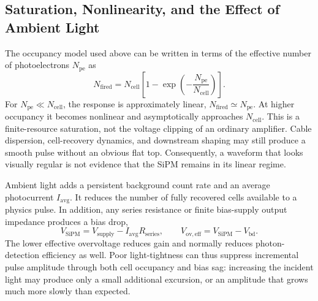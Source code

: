 \documentclass[10pt,letterpaper]{article}
\begin{document}
\subsection{Saturation, Nonlinearity, and the Effect of Ambient Light}

The occupancy model used above can be written in terms of the effective number of
photoelectrons $N_{\mathrm{pe}}$ as
\begin{equation}
  N_{\mathrm{fired}}
    = N_{\mathrm{cell}}\left[
      1-\exp\left(-\frac{N_{\mathrm{pe}}}{N_{\mathrm{cell}}}\right)
      \right].
  \label{eq:sipm-occupancy-npe}
\end{equation}
For $N_{\mathrm{pe}}\ll N_{\mathrm{cell}}$, the response is approximately linear,
$N_{\mathrm{fired}}\simeq N_{\mathrm{pe}}$. At higher occupancy it becomes nonlinear and
asymptotically approaches $N_{\mathrm{cell}}$. This is a finite-resource saturation, not
the voltage clipping of an ordinary amplifier. Cable dispersion, cell-recovery dynamics,
and downstream shaping may still produce a smooth pulse without an obvious flat top.
Consequently, a waveform that looks visually regular is not evidence that the SiPM remains
in its linear regime.

Ambient light adds a persistent background count rate and an average photocurrent
$I_{\mathrm{avg}}$. It reduces the number of fully recovered cells available to a physics
pulse. In addition, any series resistance or finite bias-supply output impedance produces
a bias drop,
\begin{equation}
  V_{\mathrm{SiPM}} = V_{\mathrm{supply}} - I_{\mathrm{avg}}R_{\mathrm{series}},
  \qquad
  V_{\mathrm{ov,eff}} = V_{\mathrm{SiPM}}-V_{\mathrm{bd}} .
  \label{eq:sipm-background-bias-drop}
\end{equation}
The lower effective overvoltage reduces gain and normally reduces photon-detection
efficiency as well. Poor light-tightness can thus suppress incremental pulse amplitude
through both cell occupancy and bias sag: increasing the incident light may produce only a
small additional excursion, or an amplitude that grows much more slowly than expected.
\end{document}
